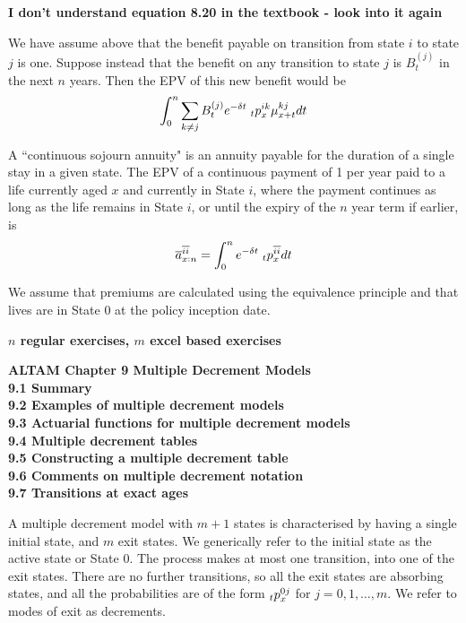 \documentclass[hidelinks, 12pt]{article}
\theoremstyle{mydefstyle}
\theoremstyle{mythmstyle}
\begin{document}
\color{red}
\textbf{I don't understand equation 8.20 in the textbook - look into it again}
\color{black}

We have assume above that the benefit payable on transition from state $i$ to state $j$ is one. Suppose instead that the benefit on any transition to state $j$ is $B_t^{(j)}$ in the next $n$ years. Then the EPV of this new benefit would be
\begin{gather*}
\int_0^n \sum_{k \ne j} B_t^{(j)} e^{-\delta t} \hspace{1mm}_tp_x^{ik} \mu_{x+t}^{kj} dt
\end{gather*}

A ``continuous sojourn annuity" is an annuity payable for the duration of a single stay in a given state. The EPV of a continuous payment of 1 per year paid to a life currently aged $x$ and currently in State $i$, where the payment continues as long as the life remains in State $i$, or until the expiry of the $n$ year term if earlier, is
\begin{gather*}
\overline{a}_{x:n}^{\overline{ii}} = \int_0^n e^{-\delta t} \hspace{1mm}_tp_x^{\overline{ii}} dt
\end{gather*}

We assume that premiums are calculated using the equivalence principle and that lives are in State 0 at the policy inception date. 

\textbf{$n$ regular exercises, $m$ excel based exercises}

\textbf{ALTAM Chapter 9 Multiple Decrement Models} \\
\textbf{9.1 Summary} \\
\textbf{9.2 Examples of multiple decrement models} \\
\textbf{9.3 Actuarial functions for multiple decrement models} \\
\textbf{9.4 Multiple decrement tables} \\
\textbf{9.5 Constructing a multiple decrement table} \\
\textbf{9.6 Comments on multiple decrement notation} \\
\textbf{9.7 Transitions at exact ages}

A multiple decrement model with $m+1$ states is characterised by having a single initial state, and $m$ exit states. We generically refer to the initial state as the active state or State 0. The process makes at most one transition, into one of the exit states. There are no further transitions, so all the exit states are absorbing states, and all the probabilities are of the form $\hspace{0mm}_tp_x^{0j}$ for $j = 0, 1, \dots, m$. We refer to modes of exit as decrements. 
\end{document}
